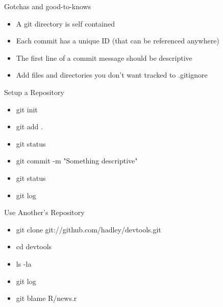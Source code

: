 \documentclass{beamer}
\begin{document}
\begin{frame}{Gotchas and good-to-knows}
  \begin{center}
    \begin{itemize}
      \item A git directory is self contained
      \item Each commit has a unique ID (that can be referenced
        anywhere)
      \item The first line of a commit message should be descriptive
      \item Add files and directories you don't want tracked to
        .gitignore
    \end{itemize}
  \end{center}
\end{frame}

\begin{frame}{Setup a Repository}
  \begin{center}
    \begin{itemize}
      \item git init
      \item git add .
      \item git status
      \item git commit -m "Something descriptive"
      \item git status
      \item git log
    \end{itemize}
  \end{center}
\end{frame}

\begin{frame}{Use Another's Repository}
  \begin{center}
    \begin{itemize}
      \item git clone git://github.com/hadley/devtools.git
      \item cd devtools
      \item ls -la
      \item git log
      \item git blame R/news.r
      \end{itemize}
  \end{center}
\end{frame}
\end{document}

